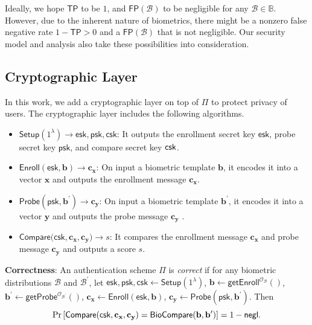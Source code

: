 Ideally, we hope $\textsf{TP}$ to be $1$, and $\textsf{FP}(\mathcal{B})$ to be negligible for any $\mathcal{B} \in \mathbb{B}$. However, due to the inherent nature of biometrics, there might be a nonzero false negative rate $ 1 - \textsf{TP} > 0$ and a $\textsf{FP}(\mathcal{B})$ that is not negligible. Our security model and analysis also take these possibilities into consideration.




\subsection{Cryptographic Layer}
\label{sec:formalization:cryptographic_layer}
In this work, we add a cryptographic layer on top of $\Pi$ to protect privacy of users. The cryptographic layer includes the following algorithms.

\begin{itemize}

	\item $\textsf{Setup}(1^\lambda) \to \textsf{esk}, \textsf{psk}, \textsf{csk}$: It outputs the enrollment secret key $\textsf{esk}$, probe secret key $\textsf{psk}$, and compare secret key $\sf csk$.

	\item $\textsf{Enroll}(\textsf{esk}, \mathbf{b}) \to \mathbf{c_x}$: On input a biometric template $\mathbf{b}$, it encodes it into a vector $\mathbf{x}$ and outputs the enrollment message $\mathbf{c_x}$.
	
	\item $\textsf{Probe}(\textsf{psk}, \mathbf{b}^\prime) \to \mathbf{c_y}$: On input a biometric template $\mathbf{b}^\prime$, it encodes it into a vector $\mathbf{y}$ and outputs the probe message $\mathbf{c_y}$ .

	\item $\textsf{Compare}(\textsf{csk}, \mathbf{c_x}, \mathbf{c_y)} \to s$: It compares the enrollment message $\mathbf{c_x}$ and probe message $\mathbf{c_y}$ and outputs a score $s$.

\end{itemize}

\noindent \textbf{Correctness}: An authentication scheme $\Pi$ is \emph{correct} if for any biometric distributions $\mathcal{B}$ and $\mathcal{B}^\prime$, let $\textsf{esk}, \textsf{psk}, \textsf{csk} \gets \textsf{Setup}(1^\lambda)$, $\mathbf{b} \gets \textsf{getEnroll}^{\mathcal{O}_\mathcal{B}}()$, $\mathbf{b}^\prime \gets \textsf{getProbe}^{\mathcal{O}_{\mathcal{B}^\prime}}()$, $\mathbf{c_x} \gets \textsf{Enroll}(\textsf{esk}, \mathbf{b})$, $\mathbf{c_y} \gets \textsf{Probe}(\textsf{psk}, \mathbf{b}^\prime)$. Then
	\[
		\Pr \left [
			\textsf{Compare}(\textsf{csk}, \mathbf{c_x}, \mathbf{c_y}) = \textsf{BioCompare}(\mathbf{b}, \mathbf{b}^\prime)
		\right ] = 1 - \mathsf{negl}.
	\]

